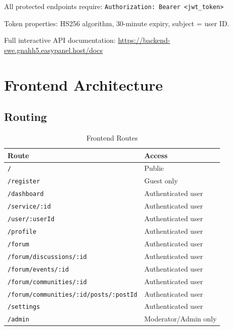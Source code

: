 \documentclass[11pt,a4paper]{report}
\begin{document}
All protected endpoints require: \texttt{Authorization: Bearer <jwt\_token>}

Token properties: HS256 algorithm, 30-minute expiry, subject = user ID.

Full interactive API documentation: \url{https://backend-swe.gnahh5.easypanel.host/docs}

\section{Frontend Architecture}

\subsection{Routing}

\begin{table}[h]
    \centering
    \begin{tabularx}{\textwidth}{|l|X|}
        \hline
        \textbf{Route}                                & \textbf{Access}      \\
        \hline
        \texttt{/}                                    & Public               \\
        \hline
        \texttt{/register}                            & Guest only           \\
        \hline
        \texttt{/dashboard}                           & Authenticated user   \\
        \hline
        \texttt{/service/:id}                         & Authenticated user   \\
        \hline
        \texttt{/user/:userId}                        & Authenticated user   \\
        \hline
        \texttt{/profile}                             & Authenticated user   \\
        \hline
        \texttt{/forum}                               & Authenticated user   \\
        \hline
        \texttt{/forum/discussions/:id}               & Authenticated user   \\
        \hline
        \texttt{/forum/events/:id}                    & Authenticated user   \\
        \hline
        \texttt{/forum/communities/:id}               & Authenticated user   \\
        \hline
        \texttt{/forum/communities/:id/posts/:postId} & Authenticated user   \\
        \hline
        \texttt{/settings}                            & Authenticated user   \\
        \hline
        \texttt{/admin}                               & Moderator/Admin only \\
        \hline
    \end{tabularx}
    \caption{Frontend Routes}
\end{table}
\end{document}
